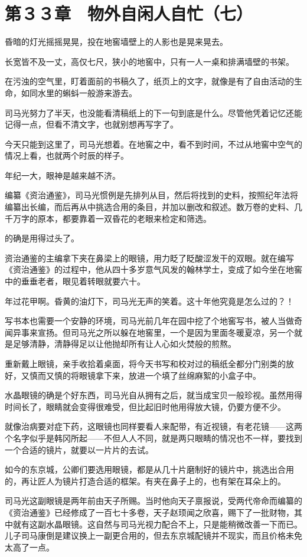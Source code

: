 \section{第３３章　物外自闲人自忙（七）}

昏暗的灯光摇摇晃晃，投在地窖墙壁上的人影也是晃来晃去。

长宽皆不及一丈，高仅七尺，狭小的地窖中，只有一人一桌和排满墙壁的书架。

在污浊的空气里，盯着面前的书稿久了，纸页上的文字，就像是有了自由活动的生命，如同水里的蝌蚪一般游来游去。

司马光努力了半天，也没能看清稿纸上的下一句到底是什么。尽管他凭着记忆还能记得一点，但看不清文字，也就别想再写字了。

今天只能到这里了，司马光想着。在地窖之中，看不到时间，不过从地窖中空气的情况上看，也就两个时辰的样子。

年纪一大，眼神是越来越不济。

编纂《资治通鉴》，司马光惯例是先排列从目，然后将找到的史料，按照纪年法将编纂出长编，而后再从中挑选合用的条目，并加以删改和叙述。数万卷的史料、几千万字的原本，都要靠着一双昏花的老眼来检定和筛选。

的确是用得过头了。

资治通鉴的主编拿下夹在鼻梁上的眼镜，用力眨了眨酸涩发干的双眼。就在编写《资治通鉴》的过程中，他从四十多岁意气风发的翰林学士，变成了如今坐在地窖中的垂垂老者，眼见着转眼就要六十。

年过花甲啊。昏黄的油灯下，司马光无声的笑着。这十年他究竟是怎么过的？！

写书本也需要一个安静的环境，司马光前几年在园中挖了个地窖写书，被人当做奇闻异事来宣扬。但司马光之所以躲在地窖里，一个是因为里面冬暖夏凉，另一个就是足够清静，清静得足以让他抛却所有让人心如火焚般的煎熬。

重新戴上眼镜，亲手收拾着桌面，将今天书写和校对过的稿纸全都分门别类的放好，又慎而又慎的将眼镜拿下来，放进一个填了丝绵麻絮的小盒子中。

水晶眼镜的确是个好东西，司马光自从拥有之后，就当成宝贝一般珍视。虽然用得时间长了，眼睛就会变得很难受，但比起旧时他用得放大镜，仍要方便不少。

就像治病要对症下药，这眼镜也同样要看人来配带，有近视镜，有老花镜——这两个名字似乎是韩冈所起——不但人人不同，就是两只眼睛的情况也不一样，要找到一个合适的镜片，就要以一片片的去试。

如今的东京城，公卿们要选用眼镜，都是从几十片磨制好的镜片中，挑选出合用的，再让匠人为镜片打造合适的框架。有夹在鼻子上的，也有架在耳朵上的。

司马光这副眼镜是两年前由天子所赐。当时他向天子禀报说，受两代帝命而编纂的《资治通鉴》已经修成了一百七十多卷，天子赵顼闻之欣喜，赐下了一批财物，其中就有这副水晶眼镜。这自然与司马光视力配合不上，只是能稍微改善一下而已。儿子司马康倒是建议换上一副更合用的，但去东京城配镜并不现实，而且价格未免太高了一点。

